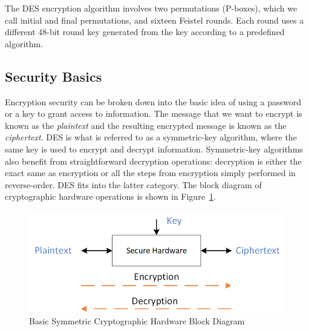\documentclass{article}
\begin{document}

The DES encryption algorithm involves 
two permutations (P-boxes), which we call initial and final permutations, and
sixteen Feistel rounds.
Each round uses a different $48$-bit round key generated
from the key according to a predefined algorithm.

\subsection{Security Basics}

Encryption security can be broken down into the basic idea of using a
password
or a key to grant access to information.  The message that we want to
encrypt is
known as the \textit{plaintext} and the resulting encrypted message is
known as the
\textit{ciphertext}.  DES is what is referred to as a symmetric-key
algorithm, where the
same key is used to encrypt and decrypt information.  Symmetric-key
algorithms
also benefit from straightforward decryption operations: decryption is either
the exact same as encryption or all the steps from encryption simply performed
in reverse-order.  DES fits into the latter category.  The block diagram of
cryptographic hardware operations is shown in
Figure~\ref{crypto_hw.png}.
\begin{figure}
  \centering
  \includegraphics[scale=1.0]{crypto_hw.png}
  \caption{Basic Symmetric Cryptographic Hardware Block Diagram}
  \label{crypto_hw.png}
\end{figure}
\end{document}
